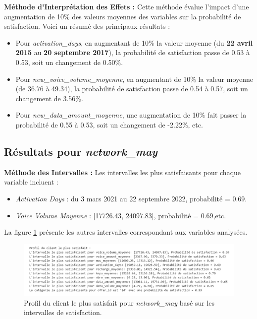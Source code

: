 \textbf{Méthode d'Interprétation des Effets :}
Cette méthode évalue l'impact d'une augmentation de 10\% des valeurs moyennes des variables sur la probabilité de satisfaction. Voici un résumé des principaux résultats :

\begin{itemize}
    \item Pour \textit{activation\_days}, en augmentant de 10\% la valeur moyenne (du \textbf{22 avril 2015} au \textbf{20 septembre 2017}), la probabilité de satisfaction passe de 0.53 à 0.53, soit un changement de 0.50\%.
    \item Pour \textit{new\_voice\_volume\_moyenne}, en augmentant de 10\% la valeur moyenne (de 36.76 à 49.34), la probabilité de satisfaction passe de 0.54 à 0.57, soit un changement de 3.56\%.
    \item Pour \textit{new\_data\_amount\_moyenne}, une augmentation de 10\% fait passer la probabilité de 0.55 à 0.53, soit un changement de -2.22\%, etc.
\end{itemize}

\subsection{Résultats pour \textit{network\_may}}

\textbf{Méthode des Intervalles :}
Les intervalles les plus satisfaisants pour chaque variable incluent :
\begin{itemize}
    \item \textit{Activation Days} : du 3 mars 2021 au 22 septembre 2022, probabilité = 0.69.
    \item \textit{Voice Volume Moyenne} : [17726.43, 24097.83], probabilité = 0.69,etc.
\end{itemize}
La figure \ref{fig:profil_satisfait_may} présente les autres intervalles correspondant aux variables analysées.
\begin{figure}[H]
    \centering
    \includegraphics[width=0.9\linewidth]{capture_modele_33.png}
    \caption{Profil du client le plus satisfait pour \textit{network\_may} basé sur les intervalles de satisfaction.}
    \label{fig:profil_satisfait_may}
\end{figure}


